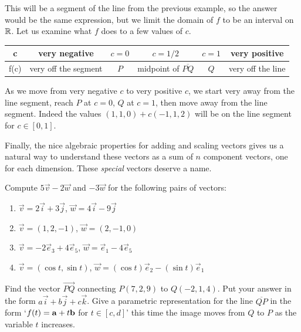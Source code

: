 This will be a segment of the line from the previous example, so the answer would be the same expression, but we limit the domain of $f$ to be an interval on $\mathbb{R}$. Let us examine what $f$ does to a few values of $c$.
\renewcommand{\arraystretch}{1.5}
\begin{center}
	\begin{tabular}{|c|c c c c c|} 
		\hline
		c & very negative & $c=0$ & $c=1/2$& $c=1$ & very positive \\ 
		\hline
		f(c) & very off the segment & $P$ & midpoint of $\overline{PQ}$& $Q$ & very off the line \\ 
		\hline
	\end{tabular}
\end{center}
As we move from very negative $c$ to very positive $c$, we start very away from the line segment, reach $P$ at $c=0$, $Q$ at $c=1$, then move away from the line segment. 
Indeed the values $(1,1,0) + c(-1,1,2)$ will be on the line segment for $c\in[0,1]$.

%
Finally, the nice algebraic properties for adding and scaling vectors gives us a natural way to understand these vectors as a sum of $n$ component vectors, one for each dimension. These \textit{special} vectors deserve a name.
\ \\
\exercises
\begin{exerciselist}
	\item Compute $5\vec{v}-2\vec{w}$ and $-3\vec{w}$ for the following pairs of vectors: \begin{enumerate}[label=(\alph*)]
		\item $\vec{v}=2\vec{i}+3\vec{j}$, $\vec{w}=4\vec{i}-9\vec{j}$
		\item $\vec{v}=(1,2,-1)$, $\vec{w}=(2,-1,0)$
		\item $\vec{v}=-2\vec{e}_3+4\vec{e}_5$, $\vec{w}=\vec{e}_1 -4\vec{e}_5$
		\item $\vec{v}=(\cos t, \sin t)$, $\vec{w}=(\cos t)\vec{e}_2 - (\sin t) \vec{e}_1$
	\end{enumerate}
	\item Find the vector $\overrightarrow{PQ}$ connecting $P(7,2,9)$ to $Q(-2,1,4)$. Put your answer in the form $a\vec{i}+b\vec{j}+c\vec{k}$. Give a parametric representation for the line $\overline{QP}$ in the form `$f(t)=\bold{a}+t\bold{b}$ for $t\in[c,d]$' this time the image moves from $Q$ to $P$ as the variable $t$ increases.
\end{exerciselist}
